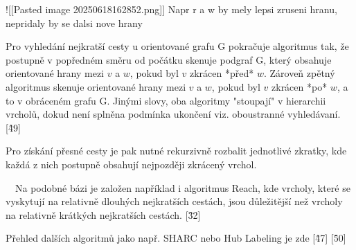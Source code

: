 ![[Pasted image 20250618162852.png]]
Napr r a w by mely lepsi zruseni hranu, nepridaly by se dalsi nove hrany

Pro vyhledání nejkratší cesty u orientované grafu G pokračuje algoritmus tak, že postupně v popředném směru od počátku skenuje podgraf G, který obsahuje orientované hrany mezi $v$ a $w$, pokud byl $v$ zkrácen *před* $w$. Zároveň zpětný algoritmus skenuje orientované hrany mezi $v$ a $w$, pokud byl $v$ zkrácen *po* $w$, a to v obráceném grafu G. Jinými slovy, oba algoritmy "stoupají" v hierarchii vrcholů, dokud není splněna podmínka ukončení viz. oboustranné vyhledávaní. [\^49] 

Pro získání přesné cesty je pak nutné rekurzivně rozbalit jednotlivé zkratky, kde každá z nich postupně obsahují nejpozději zkrácený vrchol.

~~Na podobné bázi je založen například i algoritmus Reach, kde vrcholy, které se vyskytují na relativně dlouhých nejkratších cestách, jsou důležitější než vrcholy na relativně krátkých nejkratších cestách. [\^32]~~

Přehled dalších algoritmů jako např. SHARC nebo Hub Labeling je zde [\^47] [\^50]

